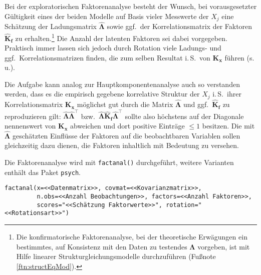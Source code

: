 Bei der exploratorischen Faktorenanalyse besteht der Wunsch, bei vorausgesetzter Gültigkeit eines der beiden Modelle auf Basis vieler Messwerte der $X_{j}$ eine Schätzung der Ladungsmatrix $\hat{\bm{\Lambda}}$ sowie ggf.\ der Korrelationsmatrix der Faktoren $\hat{\bm{K}}_{\bm{f}}$ zu erhalten.\footnote{Die konfirmatorische Faktorenanalyse, bei der theoretische Erwägungen ein bestimmtes, auf Konsistenz mit den Daten zu testendes $\bm{\Lambda}$ vorgeben, ist mit Hilfe linearer Strukturgleichungsmodelle durchzuführen (Fußnote \ref{ftn:structEqMod}).} Die Anzahl der latenten Faktoren sei dabei vorgegeben. Praktisch immer lassen sich jedoch durch Rotation viele Ladungs- und ggf.\ Korrelationsmatrizen finden, die zum selben Resultat i.\,S.\ von $\bm{K}_{\bm{x}}$ führen (s.\,u.).

Die Aufgabe kann analog zur Hauptkomponentenanalyse auch so verstanden werden, dass es die empirisch gegebene korrelative Struktur der $X_{j}$ i.\,S.\ ihrer Korrelationsmatrix $\bm{K}_{\bm{x}}$ möglichst gut durch die Matrix $\hat{\bm{\Lambda}}$ und ggf.\ $\hat{\bm{K}}_{\bm{f}}$ zu reproduzieren gilt: $\hat{\bm{\Lambda}} \hat{\bm{\Lambda}}^{\top}$ bzw.\ $\hat{\bm{\Lambda}} \hat{\bm{K}}_{\bm{f}} \hat{\bm{\Lambda}}^{\top}$ sollte also höchstens auf der Diagonale nennenswert von $\bm{K}_{\bm{x}}$ abweichen und dort positive Einträge $\leq 1$ besitzen. Die mit $\hat{\bm{\Lambda}}$ geschätzten Einflüsse der Faktoren auf die beobachtbaren Variablen sollen gleichzeitig dazu dienen, die Faktoren inhaltlich mit Bedeutung zu versehen.

Die Faktorenanalyse wird mit \lstinline!factanal()! durchgeführt, weitere Varianten enthält das Paket \lstinline!psych!.
\begin{lstlisting}
factanal(x=<<Datenmatrix>>, covmat=<<Kovarianzmatrix>>,
         n.obs=<<Anzahl Beobachtungen>>, factors=<<Anzahl Faktoren>>,
         scores="<<Schätzung Faktorwerte>>", rotation="<<Rotationsart>>")
\end{lstlisting}

